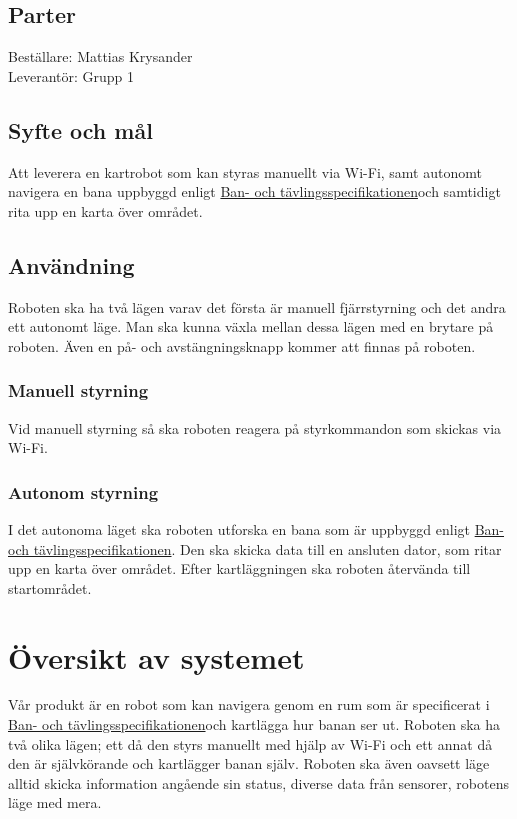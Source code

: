 \documentclass[a4paper,11pt]{article}
\newcommand{\LIPSprojektgrupp}{Grupp 1}
\newcommand{\CourseSpecUrl}{https://drive.google.com/file/d/0B6PzdGWZLymjaGZWdHlGeDNfaWs/view?usp=sharing}
\newcommand{\CourseSpecRef}{\href{\CourseSpecUrl}{Ban- och tävlingsspecifikationen}}
\begin{document}
\subsection{Parter}
Beställare: Mattias Krysander \\
Leverantör: \LIPSprojektgrupp \\

\subsection{Syfte och mål}
Att leverera en kartrobot som kan styras manuellt via Wi-Fi, samt autonomt navigera en bana uppbyggd enligt \CourseSpecRef och samtidigt rita upp en karta över området.  

\subsection{Användning}
Roboten ska ha två lägen varav det första är manuell fjärrstyrning och det andra ett autonomt läge. Man ska kunna växla mellan dessa lägen med en brytare på roboten. Även en på- och avstängningsknapp kommer att finnas på roboten.

\subsubsection{Manuell styrning}
Vid manuell styrning så ska roboten reagera på styrkommandon som skickas via Wi-Fi. 

\subsubsection{Autonom styrning}
I det autonoma läget ska roboten utforska en bana som är uppbyggd enligt \CourseSpecRef. Den ska skicka data till en ansluten dator, som ritar upp en karta över området. Efter kartläggningen ska roboten återvända till startområdet. 

\section{Översikt av systemet}
Vår produkt är en robot som kan navigera genom en rum som är specificerat i \CourseSpecRef och kartlägga hur banan ser ut. Roboten ska ha två olika lägen; ett då den styrs manuellt med hjälp av Wi-Fi och ett annat då den är självkörande och kartlägger banan själv. Roboten ska även oavsett läge alltid skicka information angående sin status, diverse data från sensorer, robotens läge med mera. 
\end{document}

